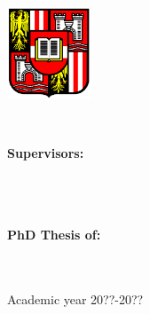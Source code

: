 





\begin{titlepage}
\begin{center}
\large



\myUni \\
\myFaculty \\
\myDepartment \\
\bigskip 
\bigskip
\bigskip
\includegraphics[width=2.5cm]{JkuLogo}

\bigskip
\bigskip
\bigskip
\bigskip
\bigskip

{\Huge\myTitle \\
}
\end{center}

\bigskip
\bigskip
\bigskip
\bigskip
\bigskip
\bigskip
\bigskip
\bigskip
   
\begin{flushleft}
{\normalsize
					\textbf{Supervisors:}\\
					\myProf \\
					\myOtherProf \\
					\myOtherProff \\
					
					}
					
\end{flushleft}

\bigskip
\bigskip
\bigskip
\begin{flushright}
\textbf{PhD Thesis of:} \\
		\myName \\
		\myMatricola \\
\end{flushright}

\bigskip
\bigskip
\bigskip
\bigskip
\bigskip
\bigskip
\bigskip
\bigskip
\bigskip
\bigskip
\bigskip
\bigskip
\bigskip

\begin{center}
{\normalsize
					Academic year 20??-20??
					}
\end{center}
\end{titlepage}






